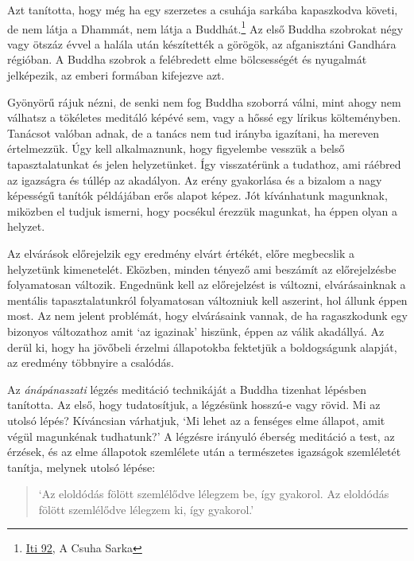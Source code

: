 Azt tanította, hogy még ha egy szerzetes a csuhája sarkába kapaszkodva
követi, de nem látja a Dhammát, nem látja a Buddhát.\footnote{\href{https://suttacentral.net/iti92}{Iti
  92}, A Csuha Sarka} Az első Buddha szobrokat négy vagy ötszáz évvel a
halála után készítették a görögök, az afganisztáni Gandhára régióban. A
Buddha szobrok a felébredett elme bölcsességét és nyugalmát jelképezik,
az emberi formában kifejezve azt.

Gyönyörű rájuk nézni, de senki nem fog Buddha szoborrá válni, mint ahogy
nem válhatsz a tökéletes meditáló képévé sem, vagy a hőssé egy lírikus
költeményben. Tanácsot valóban adnak, de a tanács nem tud irányba
igazítani, ha mereven értelmezzük. Úgy kell alkalmaznunk, hogy
figyelembe vesszük a belső tapasztalatunkat és jelen helyzetünket. Így
visszatérünk a tudathoz, ami ráébred az igazságra és túllép az
akadályon. Az erény gyakorlása és a bizalom a nagy képességű tanítók
példájában erős alapot képez. Jót kívánhatunk magunknak, miközben el
tudjuk ismerni, hogy pocsékul érezzük magunkat, ha éppen olyan a
helyzet.

Az elvárások előrejelzik egy eredmény elvárt értékét, előre megbecslik a
helyzetünk kimenetelét. Eközben, minden tényező ami beszámít az
előrejelzésbe folyamatosan változik. Engednünk kell az előrejelzést is
változni, elvárásainknak a mentális tapasztalatunkról folyamatosan
változniuk kell aszerint, hol állunk éppen most. Az nem jelent
problémát, hogy elvárásaink vannak, de ha ragaszkodunk egy bizonyos
változathoz amit `az igazinak' hiszünk, éppen az válik akadállyá. Az
derül ki, hogy ha jövőbeli érzelmi állapotokba fektetjük a boldogságunk
alapját, az eredmény többnyire a csalódás.

Az \emph{ánápánaszati} légzés meditáció technikáját a Buddha tizenhat
lépésben tanította. Az első, hogy tudatosítjuk, a légzésünk hosszú-e
vagy rövid. Mi az utolsó lépés? Kíváncsian várhatjuk, `Mi lehet az a
fenséges elme állapot, amit végül magunkénak tudhatunk?' A légzésre
irányuló éberség meditáció a test, az érzések, és az elme állapotok
szemlélete után a természetes igazságok szemléletét tanítja, melynek
utolsó lépése:

\begin{quote}
`Az eloldódás fölött szemlélődve lélegzem be, így gyakorol. Az eloldódás
fölött szemlélődve lélegzem ki, így gyakorol.'

\bigskip

\end{quote}

